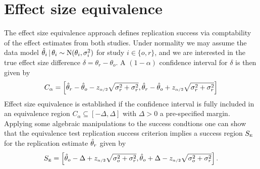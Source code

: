 \documentclass[a4paper, 11pt]{article}
\begin{document}
\section{Effect size equivalence}
The effect size equivalence approach \citep{Anderson2016} defines replication
success via comptability of the effect estimates from both studies. Under
normality we may assume the data model
$\hat{\theta}_{i} \,\vert\, \theta_{i} \sim \operatorname{N}(\theta_{i}, \sigma^{2}_{i})$ for study
$i \in \{o, r\}$, and we are interested in the true effect size difference
$\delta = \theta_{r} - \theta_{o}$. A $(1 - \alpha)$ confidence interval for
$\delta$ is then given by
\begin{align*}
  C_{\alpha} = \left[\hat{\theta}_{r} - \hat{\theta}_{o} - z_{\scriptscriptstyle \alpha/2} \sqrt{\sigma^{2}_{r} + \sigma^{2}_{r}},
  \hat{\theta}_{r} - \hat{\theta}_{o} + z_{\scriptscriptstyle \alpha/2} \sqrt{\sigma^{2}_{r} + \sigma^{2}_{r}}\right]
\end{align*}
Effect size equivalence is established if the confidence interval is fully
included in an equivalence region $C_{\alpha} \subseteq [-\Delta, \Delta]$ with
$\Delta > 0$ a pre-specified margin. Applying some algebraic manipulations to
the success condtions one can show that the equivalence test replication success
criterion implies a success region $S_{\scriptscriptstyle \text{E}}$ for the replication estimate
$\hat{\theta}_{r}$ given by
\begin{align*}
  S_{\scriptscriptstyle \text{E}}
  = \left[\hat{\theta}_{o} - \Delta + z_{\scriptscriptstyle \alpha/2} \sqrt{\sigma^{2}_{o} +
  \sigma^{2}_{r}}, \hat{\theta}_{o} + \Delta - z_{\scriptscriptstyle \alpha/2}
  \sqrt{\sigma^{2}_{o} + \sigma^{2}_{r}}\right].
\end{align*}



\end{document}

